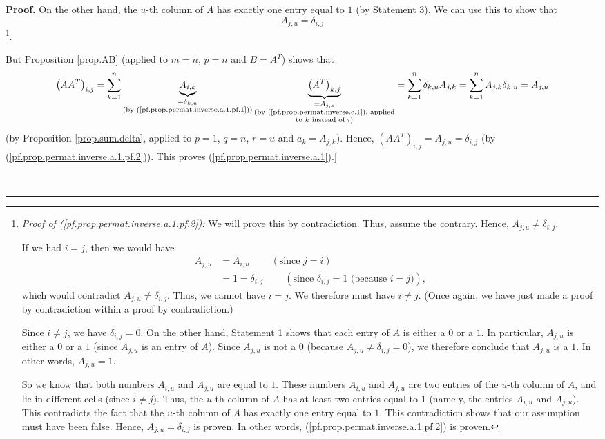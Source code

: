 \documentclass[numbers=enddot,12pt,final,onecolumn,notitlepage]{scrartcl}%
\theoremstyle{definition}
\newenvironment{proof}[1][Proof]{\noindent\textbf{#1.} }{\ \rule{0.5em}{0.5em}}
\let\sumnonlimits\sum
\renewcommand{\sum}{\sumnonlimits\limits}
\begin{document}
\begin{proof}
On the other hand, the $u$-th column of $A$ has exactly one entry equal to $1$
(by Statement 3). We can use this to show that%
\begin{equation}
A_{j,u}=\delta_{i,j} \label{pf.prop.permat.inverse.a.1.pf.2}%
\end{equation}
\footnote{\textit{Proof of (\ref{pf.prop.permat.inverse.a.1.pf.2}):} We will
prove this by contradiction. Thus, assume the contrary. Hence, $A_{j,u}%
\neq\delta_{i,j}$.
\par
If we had $i=j$, then we would have%
\begin{align*}
A_{j,u}  &  =A_{i,u}\ \ \ \ \ \ \ \ \ \ \left(  \text{since }j=i\right) \\
&  =1=\delta_{i,j}\ \ \ \ \ \ \ \ \ \ \left(  \text{since }\delta
_{i,j}=1\text{ (because }i=j\text{)}\right)  ,
\end{align*}
which would contradict $A_{j,u}\neq\delta_{i,j}$. Thus, we cannot have $i=j$.
We therefore must have $i\neq j$. (Once again, we have just made a proof by
contradiction within a proof by contradiction.)
\par
Since $i\neq j$, we have $\delta_{i,j}=0$. On the other hand, Statement 1
shows that each entry of $A$ is either a $0$ or a $1$. In particular,
$A_{j,u}$ is either a $0$ or a $1$ (since $A_{j,u}$ is an entry of $A$). Since
$A_{j,u}$ is not a $0$ (because $A_{j,u}\neq\delta_{i,j}=0$), we therefore
conclude that $A_{j,u}$ is a $1$. In other words, $A_{j,u}=1$.
\par
So we know that both numbers $A_{i,u}$ and $A_{j,u}$ are equal to $1$. These
numbers $A_{i,u}$ and $A_{j,u}$ are two entries of the $u$-th column of $A$,
and lie in different cells (since $i\neq j$). Thus, the $u$-th column of $A$
has at least two entries equal to $1$ (namely, the entries $A_{i,u}$ and
$A_{j,u}$). This contradicts the fact that the $u$-th column of $A$ has
exactly one entry equal to $1$. This contradiction shows that our assumption
must have been false. Hence, $A_{j,u}=\delta_{i,j}$ is proven. In other words,
(\ref{pf.prop.permat.inverse.a.1.pf.2}) is proven.}.

But Proposition \ref{prop.AB} (applied to $m=n$, $p=n$ and $B=A^{T}$) shows
that%
\[
\left(  AA^{T}\right)  _{i,j}=\sum_{k=1}^{n}\underbrace{A_{i,k}}%
_{\substack{=\delta_{k,u}\\\text{(by (\ref{pf.prop.permat.inverse.a.1.pf.1}%
))}}}\underbrace{\left(  A^{T}\right)  _{k,j}}_{\substack{=A_{j,k}\\\text{(by
(\ref{pf.prop.permat.inverse.c.1}), applied}\\\text{to }k\text{ instead of
}i\text{)}}}=\sum_{k=1}^{n}\delta_{k,u}A_{j,k}=\sum_{k=1}^{n}A_{j,k}%
\delta_{k,u}=A_{j,u}%
\]
(by Proposition \ref{prop.sum.delta}, applied to $p=1$, $q=n$, $r=u$ and
$a_{k}=A_{j,k}$). Hence, $\left(  AA^{T}\right)  _{i,j}=A_{j,u}=\delta_{i,j}$
(by (\ref{pf.prop.permat.inverse.a.1.pf.2})). This proves
(\ref{pf.prop.permat.inverse.a.1}).]


\end{proof}
\end{document}
